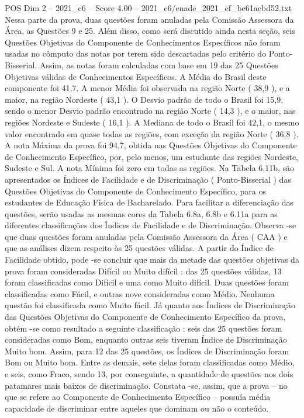 \begin{textsample}{POS Dim 2 – 2021\_c6 – Score 4.00 – 2021\_c6/enade\_2021\_ef\_be61acbd52.txt}
Nessa parte da prova, duas questões foram anuladas pela Comissão Assessora da Área, as Questões 9 e 25.
Além disso, como será discutido ainda nesta seção, seis Questões Objetivas do Componente de Conhecimentos Específicos não foram usadas no cômputo das notas por terem sido descartadas pelo critério do Ponto-Bisserial.
Assim, as notas foram calculadas com base em 19 das 25 Questões Objetivas válidas de Conhecimentos Específicos.
A Média do Brasil deste componente foi 41,7.
A menor Média foi observada na região Norte ( 38,9 ), e a maior, na região Nordeste ( 43,1 ).
O Desvio padrão de todo o Brasil foi 15,9, sendo o menor Desvio padrão encontrado na região Norte ( 14,3 ), e o maior, nas regiões Nordeste e Sudeste ( 16,1 ).
A Mediana de todo o Brasil foi 42,1, o mesmo valor encontrado em quase todas as regiões, com exceção da região Norte ( 36,8 ).
A nota Máxima da prova foi 94,7, obtida nas Questões Objetivas do Componente de Conhecimento Específico, por, pelo menos, um estudante das regiões Nordeste, Sudeste e Sul.
A nota Mínima foi zero em todas as regiões.
Na Tabela 6.11b, são apresentados os Índices de Facilidade e de Discriminação ( Ponto-Bisserial ) das Questões Objetivas do Componente de Conhecimento Específico, para os estudantes de Educação Física de Bacharelado.
Para facilitar a diferenciação das questões, serão usadas as mesmas cores da Tabela 6.8a, 6.8b e 6.11a para as diferentes classificações dos Índices de Facilidade e de Discriminação.
Observa -se que duas questões foram anuladas pela Comissão Assessora da Área ( CAA ) e que as análises dizem respeito às 25 questões válidas.
A partir do Índice de Facilidade obtido, pode -se concluir que mais da metade das questões objetivas da prova foram consideradas Difícil ou Muito difícil : das 25 questões válidas, 13 foram classificadas como Difícil e uma como Muito difícil.
Duas questões foram classificadas como Fácil, e outras nove consideradas como Médio.
Nenhuma questão foi classificada como Muito fácil.
Já quanto aos Índices de Discriminação das Questões Objetivas do Componente de Conhecimento Específico da prova, obtém -se como resultado a seguinte classificação : seis das 25 questões foram consideradas como Bom, enquanto outras seis tiveram Índice de Discriminação Muito bom.
Assim, para 12 das 25 questões, os Índices de Discriminação foram Bom ou Muito bom.
Entre as demais, sete delas foram classificadas como Médio, e seis, como Fraco, sendo 13, por conseguinte, a quantidade de questões nos dois patamares mais baixos de discriminação.
Constata -se, assim, que a prova – no que se refere ao Componente de Conhecimento Específico – possuía média capacidade de discriminar entre aqueles que dominam ou não o conteúdo.

\end{textsample}

